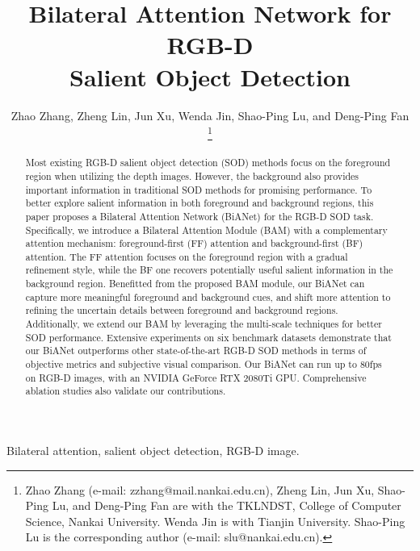 \documentclass[journal]{IEEEtran}
\begin{document}
\title{Bilateral Attention Network for RGB-D \\ Salient Object Detection}


\author{Zhao Zhang,
        Zheng Lin,
        Jun Xu,
        Wenda Jin,
        Shao-Ping Lu,
        and Deng-Ping Fan


\thanks{Zhao Zhang (e-mail: zzhang@mail.nankai.edu.cn), Zheng Lin, Jun Xu, Shao-Ping Lu, and Deng-Ping Fan are with the TKLNDST, College of Computer Science, Nankai University. 
Wenda Jin is with Tianjin University.
Shao-Ping Lu is the corresponding author (e-mail: slu@nankai.edu.cn). 
}}


\maketitle

\begin{abstract}
Most existing RGB-D salient object detection (SOD) methods focus on the foreground region when utilizing the depth images.
However, the background also provides important information in traditional SOD methods for promising performance.
To better explore salient information in both foreground and background regions, this paper proposes a Bilateral Attention Network (BiANet) for the RGB-D SOD task.
Specifically, we introduce a Bilateral Attention Module (BAM) with a complementary attention mechanism: foreground-first (FF) attention and background-first (BF) attention.
The FF attention focuses on the foreground region with a gradual refinement style,
while the BF one recovers potentially useful salient information in the background region.
Benefitted from the proposed BAM module, our BiANet can capture more meaningful foreground and background cues,
and shift more attention to refining the uncertain details between foreground and background regions.
Additionally, we extend our BAM by leveraging the multi-scale techniques for better SOD performance.
Extensive experiments on six benchmark datasets demonstrate that our BiANet outperforms other state-of-the-art RGB-D SOD methods in terms of objective metrics and subjective visual comparison.
Our BiANet can run up to 80fps
on  RGB-D images, with an NVIDIA GeForce RTX 2080Ti GPU.
Comprehensive ablation studies also validate our contributions.
\end{abstract}

\begin{IEEEkeywords}
Bilateral attention, salient object detection, RGB-D image.
\end{IEEEkeywords}
\end{document}
